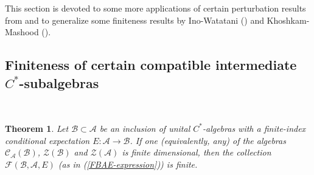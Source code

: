 \documentclass{amsart}
\numberwithin{equation}{section}
\newcommand{\mcal}{\mathcal}
\newcommand{\1}{\mathbf{1}}
\newcommand{\mA}{\mathcal{A}}
\newcommand{\mB}{\mathcal{B}}
\newtheorem{theorem}{Theorem}[section]
\begin{document}
This section is devoted to some more applications of certain
perturbation results from \cite{IW} and \cite{Dickson} to generalize
some finiteness results by Ino-Watatani (\cite{IW}) and
Khoshkam-Mashood (\cite{KM}).

\subsection{Finiteness of certain compatible intermediate $C^*$-subalgebras }\( \)

\begin{theorem}\label{F1-F2-finite}
Let $\mB \subset \mA $ be an inclusion of unital $C^{*}$-algebras with
a finite-index conditional expectation $E : \mA \rightarrow \mB$. If
one (equivalently, any) of the algebras $\mcal{C}_{\mA}(\mB)$,
$\mcal{Z}(\mB)$ and $\mcal{Z}(\mA)$ is finite dimensional, then the
collection $\mathcal{F} (\mB,
 \mA, E)$ (as in (\ref{FBAE-expression})) is finite.
\end{theorem}
\end{document}
